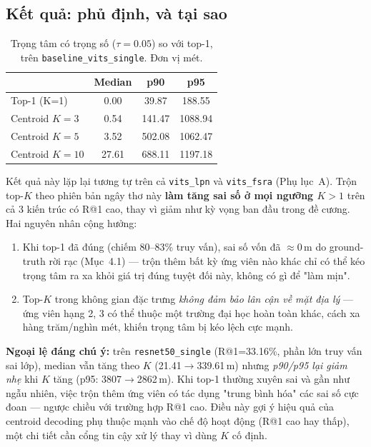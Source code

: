 \documentclass[11pt]{article}
\begin{document}
\subsection{Kết quả: phủ định, và tại sao}
\begin{table}[h]
\centering
\caption{Trọng tâm có trọng số ($\tau=0.05$) so với top-1, trên \texttt{baseline\_vits\_single}. Đơn vị mét.}
\begin{tabular}{lccc}
\toprule
 & Median & p90 & p95 \\
\midrule
Top-1 (K=1)          & 0.00  & 39.87  & 188.55 \\
Centroid $K=3$        & 0.54  & 141.47 & 1088.94 \\
Centroid $K=5$        & 3.52  & 502.08 & 1062.47 \\
Centroid $K=10$       & 27.61 & 688.11 & 1197.18 \\
\bottomrule
\end{tabular}
\end{table}

Kết quả này lặp lại tương tự trên cả \texttt{vits\_lpn} và \texttt{vits\_fsra} (Phụ lục~A). Trộn top-$K$ theo phiên bản ngây thơ này \textbf{làm tăng sai số ở mọi ngưỡng $K>1$} trên cả 3 kiến trúc có R@1 cao, thay vì giảm như kỳ vọng ban đầu trong đề cương. Hai nguyên nhân cộng hưởng:
\begin{enumerate}
  \item Khi top-1 đã đúng (chiếm 80--83\% truy vấn), sai số vốn đã $\approx0$\,m do ground-truth rời rạc (Mục~4.1) — trộn thêm bất kỳ ứng viên nào khác chỉ có thể kéo trọng tâm ra xa khỏi giá trị đúng tuyệt đối này, không có gì để "làm mịn".
  \item Top-$K$ trong không gian đặc trưng \emph{không đảm bảo lân cận về mặt địa lý} — ứng viên hạng 2, 3 có thể thuộc một trường đại học hoàn toàn khác, cách xa hàng trăm/nghìn mét, khiến trọng tâm bị kéo lệch cực mạnh.
\end{enumerate}

\textbf{Ngoại lệ đáng chú ý:} trên \texttt{resnet50\_single} (R@1=33.16\%, phần lớn truy vấn sai lớp), median vẫn tăng theo $K$ (21.41$\to$339.61\,m) nhưng \emph{p90/p95 lại giảm nhẹ} khi $K$ tăng (p95: 3807$\to$2862\,m). Khi top-1 thường xuyên sai và gần như ngẫu nhiên, việc trộn thêm ứng viên có tác dụng "trung bình hóa" các sai số cực đoan — ngược chiều với trường hợp R@1 cao. Điều này gợi ý hiệu quả của centroid decoding phụ thuộc mạnh vào chế độ hoạt động (R@1 cao hay thấp), một chi tiết cần cổng tin cậy xử lý thay vì dùng $K$ cố định.
\end{document}
